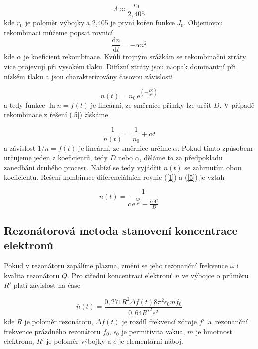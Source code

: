 \documentclass[a4paper,12pt]{article}
\newcommand{\e}{\text{e}}
\begin{document}
\begin{equation}
	\Lambda \approx \frac{r_0}{2,405}
\end{equation}
kde $r_0$ je poloměr výbojky a 2,405 je první kořen funkce $J_0$.
Objemovou rekombinaci můžeme popsat rovnicí
\begin{equation}
	\frac{\text{d}n}{\text{d}t} = -\alpha n^2
	\label{5}
\end{equation}
kde $\alpha$ je koeficient rekombinace. Kvůli trojným srážkám se rekombinační ztráty více projevují při vysokém tlaku. Difúzní ztráty jsou naopak dominantní při nízkém tlaku a jsou charakterizovány časovou závislostí 

\begin{equation}
	n(t) = n_0\,\e^{\left( -\frac{Dt}{\Lambda^2}\right)}
\end{equation}
a tedy funkce $\ln n = f(t)$ je lineární, ze směrnice přímky lze určit $D$. V 
případě rekombinace z řešení (\ref{5}) získáme

\begin{equation}
	\frac{1}{n(t)} = \frac{1}{n_0} + \alpha t
\end{equation} 
a závislost $1/n = f(t)$ je lineární, ze směrnice určíme $\alpha$. Pokud tímto 
způsobem určujeme jeden z koeficientů, tedy $D$ nebo $\alpha$, děláme to za 
předpokladu zanedbání druhého procesu. Nabízí se tedy vyjádřit $n(t)$ se 
zahrnutím obou koeficientů. Řešení kombinace diferenciálních rovnic (\ref{1}) a (\ref{5}) je vztah

\begin{equation}
	n(t) = \frac{1}{c\,\e^{\frac{tD}{\Lambda^2}}-\frac{\alpha \Lambda^2}{D}}
	\label{zpresnena}
\end{equation}

\subsection{Rezonátorová metoda stanovení koncentrace elektronů}
Pokud v rezonátoru zapálíme plazma, změní se jeho rezonanční frekvence $\omega$ i kvalita rezonátoru $Q$. Pro střední koncentraci elektronů $\overline{n}$ ve výbojce o průměru $R'$ platí závislost na čase

\begin{equation}
	\overline{n}(t) = \frac{0,271 R^2 \Delta f(t) 8 \pi^2 \epsilon_0 m f_0}{0,64 R'^2 e^2}
	\label{koncentrace}
\end{equation}
kde $R$ je poloměr rezonátoru, $\Delta f(t)$ je rozdíl frekvencí zdroje $f'$~a~rezonanční frekvence prázdného rezonátoru 
$f_0$, $\epsilon_0$ je permitivita vakua, $m$ je hmotnost elektronu, $R'$ je 
poloměr výbojky a $e$ je elementární náboj.
\end{document}
